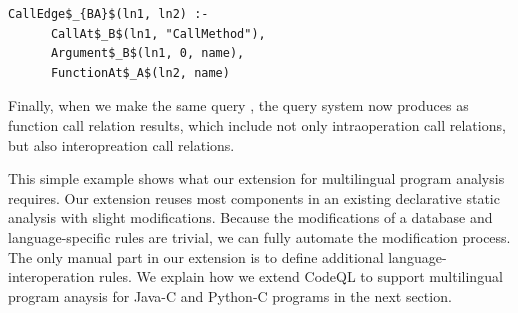 
\begin{lstlisting}[style=mrule]
    CallEdge$_{BA}$(ln1, ln2) :-
      CallAt$_B$(ln1, "CallMethod"),
      Argument$_B$(ln1, 0, name),
      FunctionAt$_A$(ln2, name)
\end{lstlisting}

%

Finally, when we make the same query , the query system
now produces  as function call relation results,
which include not only intraoperation call relations,
but also interopreation call relations. 

This simple example shows what our extension for multilingual program analysis
requires. Our extension reuses most components in an existing declarative static
analysis with slight modifications. Because the modifications of a database and
language-specific rules are trivial, we can fully automate the modification
process.  The only manual part in our extension is to define additional
language-interoperation rules. We explain how we extend CodeQL to support
multilingual program anaysis for Java-C and Python-C programs in the next section.


